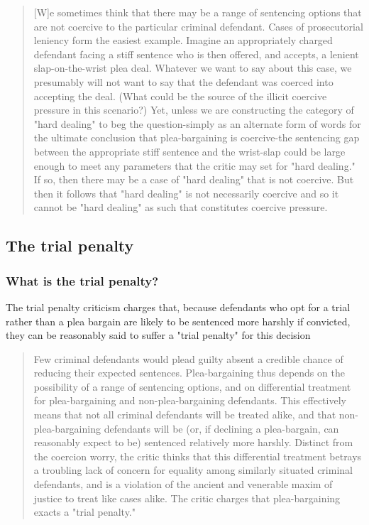 \begin{quote}
    [W]e sometimes think that there may be a range of sentencing options that are not coercive to the particular criminal defendant. Cases of prosecutorial leniency form the easiest example. Imagine an appropriately charged defendant facing a stiff sentence who is then offered, and accepts, a lenient slap-on-the-wrist plea deal. Whatever we want to say about this case, we presumably will not want to say that the defendant was coerced into accepting the deal. (What could be the source of the illicit coercive pressure in this scenario?) Yet, unless we are constructing the category of "hard dealing" to beg the question-simply as an alternate form of words for the ultimate conclusion that plea-bargaining is coercive-the sentencing gap between the appropriate stiff sentence and the wrist-slap could be large enough to meet any parameters that the critic may set for "hard dealing." If so, then there may be a case of "hard dealing" that is not coercive. But then it follows that "hard dealing" is not necessarily coercive and so it cannot be "hard dealing" as such that constitutes coercive pressure.
\end{quote}

\subsection{The trial penalty}

\subsubsection{What is the trial penalty?}
The trial penalty criticism charges that, because defendants who opt for a trial rather than a plea bargain are likely to be sentenced more harshly if convicted, they can be reasonably said to suffer a "trial penalty" for this decision
\begin{quote}
    Few criminal defendants would plead guilty absent a credible chance of reducing their expected sentences. Plea-bargaining thus depends on the possibility of a range of sentencing options, and on differential treatment for plea-bargaining and non-plea-bargaining defendants. This effectively means that not all criminal defendants will be treated alike, and that non-plea-bargaining defendants will be (or, if declining a plea-bargain, can reasonably expect to be) sentenced relatively more harshly. Distinct from the coercion worry, the critic thinks that this differential treatment betrays a troubling lack of concern for equality among similarly situated criminal defendants, and is a violation of the ancient and venerable maxim of justice to treat like cases alike. The critic charges that plea-bargaining exacts a "trial penalty."
\end{quote}

